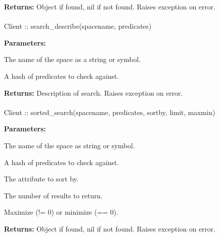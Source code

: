 \noindent\textbf{Returns:}
Object if found, nil if not found.  Raises exception on error.

\paragraph{}
\begin{ccode}
Client :: search_describe(spacename, predicates)
\end{ccode}
\funcdesc 

\noindent\textbf{Parameters:}
\begin{description}[labelindent=\widthof{{\code{predicates}}},leftmargin=*,noitemsep,nolistsep,align=right]
\item[\code{spacename}] The name of the space as a string or symbol.
\item[\code{predicates}] A hash of predicates to check against.
\end{description}

\noindent\textbf{Returns:}
Description of search.  Raises exception on error.

\paragraph{}
\begin{ccode}
Client :: sorted_search(spacename, predicates, sortby, limit, maxmin)
\end{ccode}
\funcdesc 

\noindent\textbf{Parameters:}
\begin{description}[labelindent=\widthof{{\code{predicates}}},leftmargin=*,noitemsep,nolistsep,align=right]
\item[\code{spacename}] The name of the space as string or symbol.
\item[\code{predicates}] A hash of predicates to check against.
\item[\code{sortby}] The attribute to sort by.
\item[\code{limit}] The number of results to return.
\item[\code{maxmin}] Maximize (!= 0) or minimize (== 0).
\end{description}

\noindent\textbf{Returns:}
Object if found, nil if not found.  Raises exception on error.

